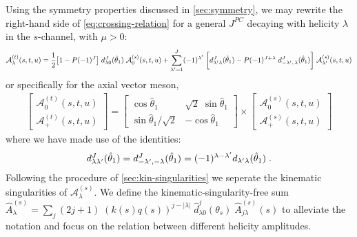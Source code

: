 Using the symmetry properties discussed in \cref{sec:symmetry}, we may rewrite the right-hand side of \cref{eq:crossing-relation} for a general \(J^{PC}\) decaying with helicity \(\lambda\) in the \(s\)-channel, with \(\mu > 0\):
  \begin{align} \label{gggg}
      \mathcal{A}_\lambda^{(t)}(s, t, u) = \frac{1}{2} \big[1- P(-1)^J \big] \; d_{ \lambda0}^J(\hat{\theta}_1) \; \mathcal{A}^{(s)}_0(s,t,u)
       + \sum_{{\lambda^\prime} = 1}^J (-1)^{\lambda^\prime} \;\bigg[ d_{ {\lambda^\prime} \lambda}^J(\hat{\theta}_1) - P (-1)^{J+\lambda} \; d_{-{\lambda^\prime}, \, \lambda }^J(\hat{\theta}_1) \bigg] \; \mathcal{A}_{{\lambda^\prime}}^{(s)}(s,t,u)
  \end{align}
or specifically for the axial vector meson,
  \begin{align} \label{matrix-helicity}
    \begin{bmatrix}
  \mathcal{A}^{(t)}_0(s,t,u) \\
   \mathcal{A}^{(t)}_+(s,t,u)
    \end{bmatrix}
    =
    \begin{bmatrix}
       \cos \hat{\theta}_1   &   \sqrt{2} \; \sin \hat{\theta}_1   \\
       \sin \hat{\theta}_1 / \sqrt{2}   &  - \cos \hat{\theta}_1
    \end{bmatrix}
    \times
    \begin{bmatrix}
  \mathcal{A}^{(s)}_0(s,t,u) \\
   \mathcal{A}^{(s)}_+(s,t,u)
    \end{bmatrix}
  \end{align}
where we have made use of the identities:
  \begin{equation}
    d_{\lambda {\lambda^\prime}}^J(\hat{\theta}_1) = d^J_{-{\lambda^\prime}, -\lambda}(\hat{\theta}_1) = (-1)^{\lambda - {\lambda^\prime}} d_{{\lambda^\prime} \lambda}(\hat{\theta}_1) \; .
  \end{equation}
Following the procedure of \cref{sec:kin-singularities} we seperate the kinematic singularities of \(\mathcal{A}_\lambda^{(s)}\). We define the kinematic-singularity-free sum
\(\hat{A}_\lambda^{(s)} = \sum_j (2j+1) \; (k(s)q(s))^{j-|\lambda|} \; \hat{d}^j_{\lambda0}(\theta_s) \; \hat{A}^{(s)}_{j\lambda}(s)\) to alleviate the notation and focus on the relation between different helicity amplitudes.
